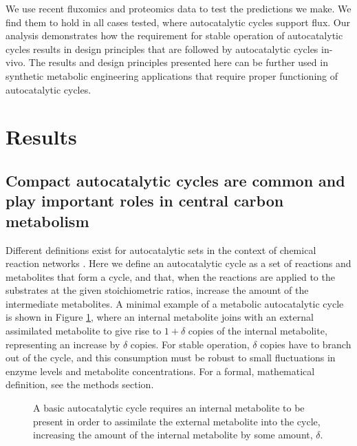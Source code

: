     We use recent fluxomics and proteomics data to test the predictions we make.
    We find them to hold in all cases tested, where autocatalytic cycles support flux.
    Our analysis demonstrates how the requirement for stable operation of autocatalytic cycles results in design principles that are followed by autocatalytic cycles in-vivo.
    The results and design principles presented here can be further used in synthetic metabolic engineering applications that require proper functioning of autocatalytic cycles.

\section{Results}
\subsection{Compact autocatalytic cycles are common and play important roles in central carbon metabolism}
Different definitions exist for autocatalytic sets in the context of chemical reaction networks \cite{Hordijk2004-xe, Eigen2012-ti, Kun2008-xg}.
Here we define an autocatalytic cycle as a set of reactions and metabolites that form a cycle, and that, when the reactions are applied to the substrates at the given stoichiometric ratios, increase the amount of the intermediate metabolites.
A minimal example of a metabolic autocatalytic cycle is shown in Figure \ref{fig:autocataldef}, where an internal metabolite joins with an external assimilated metabolite to give rise to $1+\delta$ copies of the internal metabolite, representing an increase by $\delta$ copies.
For stable operation, $\delta$ copies have to branch out of the cycle, and this consumption must be robust to small fluctuations in enzyme levels and metabolite concentrations.
For a formal, mathematical definition, see the methods section.

\begin{figure}[!htb]
    \centering{
        }
\caption{
    \label{fig:autocataldef}
  A basic autocatalytic cycle requires an internal metabolite to be present in order to assimilate the external metabolite into the cycle, increasing the amount of the internal metabolite by some amount, $\delta$.}
\end{figure}

